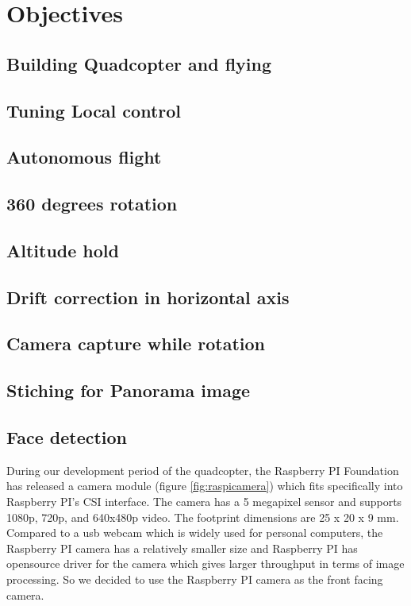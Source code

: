 \documentclass[11pt, a4paper, onecolumn, oneside, parskip=half]{scrartcl}
\begin{document}
\section{Objectives}
\label{sec:objectives}

\subsection{Building Quadcopter and flying}
\label{sec:objectives:building}

\subsection{Tuning Local control}
\label{sec:objectives:tuning}

\subsection{Autonomous flight}
\label{sec:objectives:autonomous}

\subsection{360 degrees rotation}
\label{sec:objectives:panorama}

\subsection{Altitude hold}
\label{sec:objectives:altitude}

\subsection{Drift correction in horizontal axis}
\label{sec:objectives:drift}

\subsection{Camera capture while rotation}
\label{sec:objectives:cameraCaptureRotate}

\subsection{Stiching for Panorama image}
\label{sec:objectives:stitching}

\subsection{Face detection}
\label{sec:objectives:face}
During our development period of the quadcopter, the Raspberry PI Foundation has released a camera module (figure \ref{fig:raspicamera}) which fits specifically into Raspberry PI's CSI interface. The camera has a 5 megapixel sensor and supports 1080p, 720p, and 640x480p video. The footprint dimensions are 25 x 20 x 9 mm. Compared to a usb webcam which is widely used for personal computers, the Raspberry PI camera has a relatively smaller size and Raspberry PI has opensource driver for the camera which gives larger throughput in terms of image processing. So we decided to use the Raspberry PI camera as the front facing camera.
\end{document}
